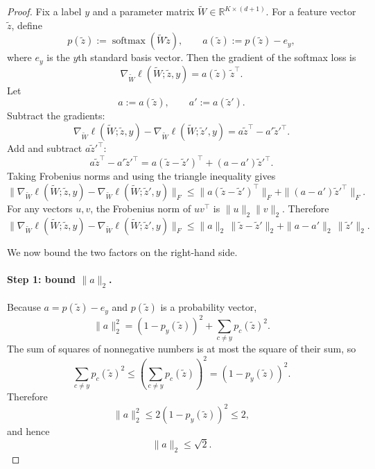 \documentclass[conference,compsoc]{IEEEtran}
\DeclareMathOperator{\softmax}{softmax}
\begin{document}
\begin{proof}
Fix a label $y$ and a parameter matrix $\widetilde W\in\mathbb{R}^{K\times(d+1)}$. For a feature vector $\widetilde z$, define
\[
p(\widetilde z):=\softmax(\widetilde W\widetilde z),
\qquad
a(\widetilde z):=p(\widetilde z)-e_y,
\]
where $e_y$ is the $y$th standard basis vector. Then the gradient of the softmax loss is
\[
\nabla_{\widetilde W}\ell(\widetilde W;\widetilde z,y)
=
a(\widetilde z)\,\widetilde z^\top.
\]
Let
\[
a:=a(\widetilde z),
\qquad
a':=a(\widetilde z').
\]
Subtract the gradients:
\[
\nabla_{\widetilde W}\ell(\widetilde W;\widetilde z,y)
-
\nabla_{\widetilde W}\ell(\widetilde W;\widetilde z',y)
=
a\widetilde z^\top-a'\widetilde z'^\top.
\]
Add and subtract $a\widetilde z'^\top$:
\[
a\widetilde z^\top-a'\widetilde z'^\top
=
a(\widetilde z-\widetilde z')^\top+(a-a')\widetilde z'^\top.
\]
Taking Frobenius norms and using the triangle inequality gives
\[
\bigl\|
\nabla_{\widetilde W}\ell(\widetilde W;\widetilde z,y)
-
\nabla_{\widetilde W}\ell(\widetilde W;\widetilde z',y)
\bigr\|_F
\le
\|a(\widetilde z-\widetilde z')^\top\|_F
+
\|(a-a')\widetilde z'^\top\|_F.
\]
For any vectors $u,v$, the Frobenius norm of $uv^\top$ is $\|u\|_2\|v\|_2$. Therefore
\begin{equation}
\label{eq:softmax-split}
\bigl\|
\nabla_{\widetilde W}\ell(\widetilde W;\widetilde z,y)
-
\nabla_{\widetilde W}\ell(\widetilde W;\widetilde z',y)
\bigr\|_F
\le
\|a\|_2\,\|\widetilde z-\widetilde z'\|_2
+
\|a-a'\|_2\,\|\widetilde z'\|_2.
\end{equation}

We now bound the two factors on the right-hand side.

\paragraph{Step 1: bound $\|a\|_2$.}
Because $a=p(\widetilde z)-e_y$ and $p(\widetilde z)$ is a probability vector,
\[
\|a\|_2^2
=
(1-p_y(\widetilde z))^2+\sum_{c\neq y}p_c(\widetilde z)^2.
\]
The sum of squares of nonnegative numbers is at most the square of their sum, so
\[
\sum_{c\neq y}p_c(\widetilde z)^2
\le
\left(\sum_{c\neq y}p_c(\widetilde z)\right)^2
=
(1-p_y(\widetilde z))^2.
\]
Therefore
\[
\|a\|_2^2
\le
2(1-p_y(\widetilde z))^2
\le
2,
\]
and hence
\begin{equation}
\label{eq:a-bound}
\|a\|_2\le \sqrt{2}.
\end{equation}


\end{proof}
\end{document}
